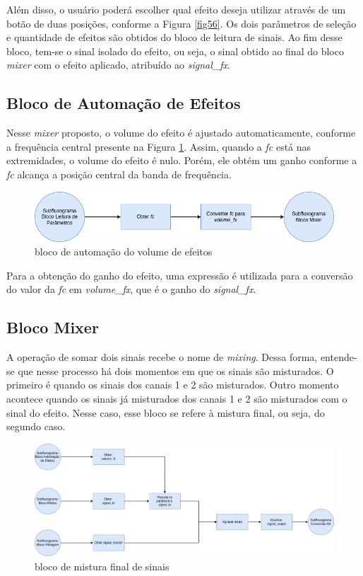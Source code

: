 Além disso, o usuário poderá escolher qual efeito deseja utilizar através de um botão de duas posições, conforme a Figura \ref{fig56}. Os dois parâmetros de seleção e quantidade de efeitos são obtidos do bloco de leitura de sinais. Ao fim desse bloco, tem-se o sinal isolado do efeito, ou seja, o sinal obtido ao final do bloco \textit{mixer} com o efeito aplicado, atribuído ao \textit{signal\_fx}. 

\subsection{Bloco de Automação de Efeitos}

Nesse \textit{mixer} proposto, o volume do efeito é ajustado automaticamente, conforme a frequência central presente na Figura \ref{fig57}. Assim, quando a \textit{fc} está nas extremidades, o volume do efeito é nulo. Porém, ele obtém um ganho conforme a \textit{fc} alcança a posição central da banda de frequência.

\begin{figure}[h]
    \centering
    \includegraphics[width=\textwidth]{figuras/fig57.png}
    \caption{bloco de automação do volume de efeitos}
    \label{fig57}
\end{figure}

Para a obtenção do ganho do efeito, uma expressão é utilizada para a conversão do valor da \textit{fc} em \textit{volume\_fx}, que é o ganho do \textit{signal\_fx}.

\subsection{Bloco Mixer}

A operação de somar dois sinais recebe o nome de \textit{mixing}. Dessa forma, entende-se que nesse processo há dois momentos em que os sinais são misturados. O primeiro é quando os sinais dos canais 1 e 2 são misturados. Outro momento acontece quando os sinais já misturados dos canais 1 e 2 são misturados com o sinal do efeito. Nesse caso, esse bloco se refere à mistura final, ou seja, do segundo caso.

\begin{figure}[h]
    \centering
    \includegraphics[width=\textwidth]{figuras/fig58.png}
    \caption{bloco de mistura final de sinais}
    \label{fig58}
\end{figure}

